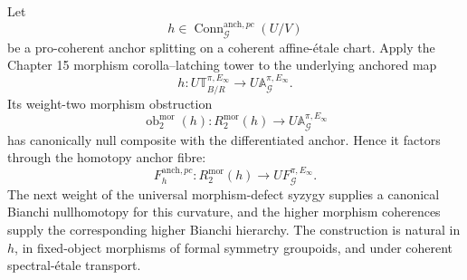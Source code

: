 \begin{theorem}
\label{thm:symmetry-noether-intrinsic-procoherent-anchor-curvature-and-bianchi-hierarchy}
Let
\[
h\in
\operatorname{Conn}_{\mathcal G}^{\mathrm{anch},pc}(U/V)
\]
be a pro-coherent anchor splitting on a coherent affine-\'etale chart.  Apply the
Chapter 15 morphism corolla--latching tower to the underlying anchored map
\[
h:
U\mathbb T_{B/R}^{\pi,E_\infty}
\longrightarrow
U\mathbb A_{\mathcal G}^{\pi,E_\infty}.
\]
Its weight-two morphism obstruction
\[
\operatorname{ob}^{\mathrm{mor}}_2(h):
R_2^{\mathrm{mor}}(h)
\longrightarrow
U\mathbb A_{\mathcal G}^{\pi,E_\infty}
\]
has canonically null composite with the differentiated anchor.  Hence it factors
through the homotopy anchor fibre:
\[
\boxed{
F_h^{\mathrm{anch},pc}:
R_2^{\mathrm{mor}}(h)
\longrightarrow
UF_{\mathcal G}^{\pi,E_\infty}.
}
\]
The next weight of the universal morphism-defect syzygy supplies a canonical
Bianchi nullhomotopy for this curvature, and the higher morphism coherences supply
the corresponding higher Bianchi hierarchy.  The construction is natural in $h$,
in fixed-object morphisms of formal symmetry groupoids, and under coherent
spectral-\'etale transport.
\end{theorem}

